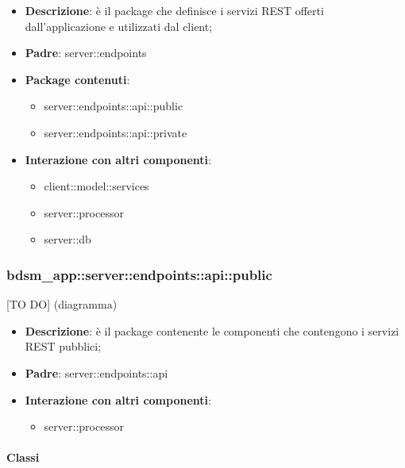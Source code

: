 \begin{itemize}
  \item \textbf{Descrizione}: è il package che definisce i servizi REST offerti dall'applicazione e utilizzati dal client;
  \item \textbf{Padre}: server::endpoints
  \item \textbf{Package contenuti}:
  	\begin{itemize}
  		\item server::endpoints::api::public
  		\item server::endpoints::api::private
	\end{itemize}
  \item \textbf{Interazione con altri componenti}:
  	\begin{itemize}
  		\item client::model::services
  		\item server::processor
  		\item server::db
	\end{itemize}
\end{itemize}

\subsubsection{bdsm\_app::server::endpoints::api::public} %
\label{ssub:bdsm_app_server_endpoints_api_public}
[TO DO] (diagramma) \newline \newline

\begin{itemize}
  \item \textbf{Descrizione}: è il package contenente le componenti che contengono i servizi REST pubblici;
  \item \textbf{Padre}: server::endpoints::api
  \item \textbf{Interazione con altri componenti}:
  	\begin{itemize}
        \item server::processor
    \end{itemize}
\end{itemize}

	\paragraph{Classi} %


